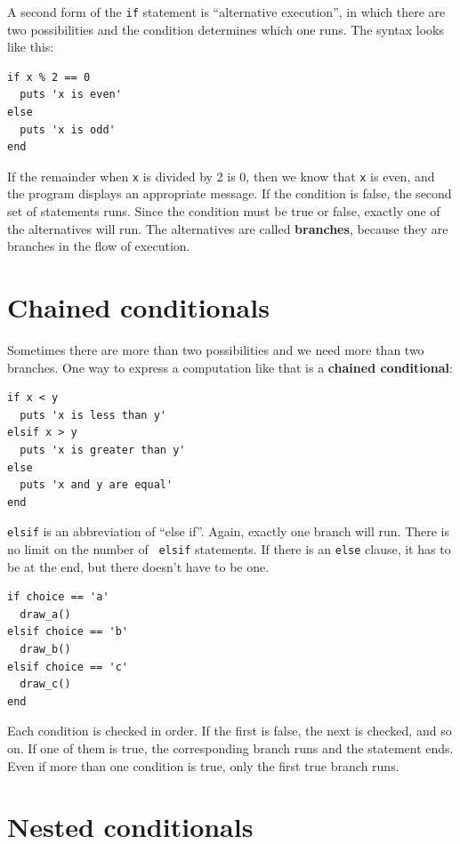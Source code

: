 \documentclass[10pt]{book}
\begin{document}
A second form of the {\tt if} statement is ``alternative execution'',
in which there are two possibilities and the condition determines
which one runs.  The syntax looks like this:

\begin{verbatim}
if x % 2 == 0
  puts 'x is even'
else
  puts 'x is odd'
end
\end{verbatim}
%
If the remainder when {\tt x} is divided by 2 is 0, then we know that
{\tt x} is even, and the program displays an appropriate message.  If
the condition is false, the second set of statements runs.
Since the condition must be true or false, exactly one of the
alternatives will run.  The alternatives are called {\bf
  branches}, because they are branches in the flow of execution.



\section{Chained conditionals}

Sometimes there are more than two possibilities and we need more than
two branches.  One way to express a computation like that is a {\bf
chained conditional}:

\begin{verbatim}
if x < y
  puts 'x is less than y'
elsif x > y
  puts 'x is greater than y'
else
  puts 'x and y are equal'
end
\end{verbatim}
%
{\tt elsif} is an abbreviation of ``else if''.  Again, exactly one
branch will run.  There is no limit on the number of {\tt
elsif} statements.  If there is an {\tt else} clause, it has to be
at the end, but there doesn't have to be one.

\begin{verbatim}
if choice == 'a'
  draw_a()
elsif choice == 'b'
  draw_b()
elsif choice == 'c'
  draw_c()
end
\end{verbatim}
%
Each condition is checked in order.  If the first is false,
the next is checked, and so on.  If one of them is
true, the corresponding branch runs and the statement
ends.  Even if more than one condition is true, only the
first true branch runs.  


\section{Nested conditionals}
\end{document}
